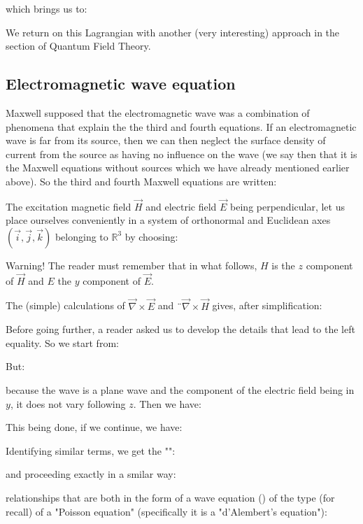 	which brings us to:
	
	\begin{tcolorbox}[title=Remark,colframe=black,arc=10pt]
	We return on this Lagrangian with another (very interesting) approach in the section of Quantum Field Theory.
	\end{tcolorbox}
	
	\pagebreak
	\subsection{Electromagnetic wave equation}
	Maxwell supposed that the electromagnetic wave was a combination of phenomena that explain the the third and fourth equations. If an electromagnetic wave is far from its source, then we can then neglect the surface density of current from the source as having no influence on the wave (we say then that it is the Maxwell equations without sources which we have already mentioned earlier above). So the third and fourth Maxwell equations are written:
	
	The excitation magnetic field $\vec{H}$ and electric field  $\vec{E}$ being perpendicular, let us place ourselves conveniently in a system of orthonormal and Euclidean axes $(\vec{i},\vec{j},\vec{k})$ belonging to $\mathbb{R}^3$ by choosing:
	
	\begin{tcolorbox}[title=Remark,colframe=black,arc=10pt]
	Warning! The reader must remember that in what follows, $H$ is the $z$ component of $\vec{H}$ and $E$ the $y$ component of $\vec{E}$.
	\end{tcolorbox}
	The (simple) calculations of $\vec{\nabla}\times\vec{E}$ and $¨\vec{\nabla}\times\vec{H}$ gives, after simplification:
	
	Before going further, a reader asked us to develop the details that lead to the left equality. So we start from:
	
	But:
	
	because the wave is a plane wave and the component of the electric field being in $y$, it does not vary following $z$. Then we have:
	
	This being done, if we continue, we have:
	
	Identifying similar terms, we get the "":
	
	and proceeding exactly in a smilar way:
	
	relationships that are both in the form of a wave equation () of the type (for recall) of a "Poisson equation" (specifically it is a "d'Alembert's equation"):
	
